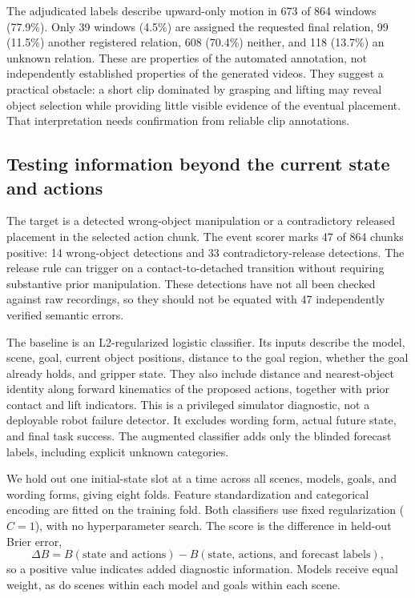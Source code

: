 \documentclass{article}
\begin{document}
The adjudicated labels describe upward-only motion in 673 of 864 windows (77.9\%). Only 39 windows (4.5\%) are assigned the requested final relation, 99 (11.5\%) another registered relation, 608 (70.4\%) neither, and 118 (13.7\%) an unknown relation. These are properties of the automated annotation, not independently established properties of the generated videos. They suggest a practical obstacle: a short clip dominated by grasping and lifting may reveal object selection while providing little visible evidence of the eventual placement. That interpretation needs confirmation from reliable clip annotations.

\subsection{Testing information beyond the current state and actions}

The target is a detected wrong-object manipulation or a contradictory released placement in the selected action chunk. The event scorer marks 47 of 864 chunks positive: 14 wrong-object detections and 33 contradictory-release detections. The release rule can trigger on a contact-to-detached transition without requiring substantive prior manipulation. These detections have not all been checked against raw recordings, so they should not be equated with 47 independently verified semantic errors.

The baseline is an L2-regularized logistic classifier. Its inputs describe the model, scene, goal, current object positions, distance to the goal region, whether the goal already holds, and gripper state. They also include distance and nearest-object identity along forward kinematics of the proposed actions, together with prior contact and lift indicators. This is a privileged simulator diagnostic, not a deployable robot failure detector. It excludes wording form, actual future state, and final task success. The augmented classifier adds only the blinded forecast labels, including explicit unknown categories.

We hold out one initial-state slot at a time across all scenes, models, goals, and wording forms, giving eight folds. Feature standardization and categorical encoding are fitted on the training fold. Both classifiers use fixed regularization ($C=1$), with no hyperparameter search. The score is the difference in held-out Brier error,
\[
\Delta B = B(\text{state and actions}) - B(\text{state, actions, and forecast labels}),
\]
so a positive value indicates added diagnostic information. Models receive equal weight, as do scenes within each model and goals within each scene.
\end{document}
